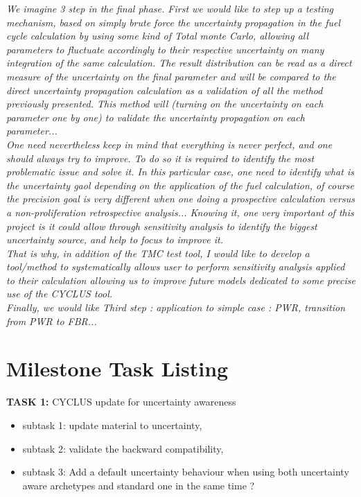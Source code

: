 \documentclass[dvips,12pt]{article}
\begin{document}
\textit{We imagine 3 step in the final phase. First we would like to step up a testing mechanism, based on simply brute force the uncertainty propagation in the fuel cycle calculation by using some kind of Total monte Carlo, allowing all parameters to fluctuate accordingly to their respective uncertainty on many integration of the same calculation. The result distribution can be read as a direct measure of the uncertainty on the final parameter and will be compared to the direct uncertainty propagation calculation as a validation of all the method previously presented. This method will (turning on the uncertainty on each parameter one by one) to validate the uncertainty propagation on each parameter...\\
One need nevertheless keep in mind that everything is never perfect, and one should always try to improve. To do so it is required to identify the most problematic issue and solve it. In this particular case, one need to identify what is the uncertainty gaol depending on the application of the fuel calculation, of course the precision goal is very different when one doing a prospective calculation versus a non-proliferation retrospective analysis... Knowing it, one very important of this project is it could allow through sensitivity analysis to identify the biggest uncertainty source, and help to focus to improve it.\\
That is why, in addition of the TMC test tool, I would like to develop a tool/method to systematically allows user to perform sensitivity analysis applied to their calculation allowing us to improve future models dedicated to some precise use of the CYCLUS tool.\\
Finally, we would like
Third step : application to simple case : PWR, transition from PWR to FBR...}

\pagebreak
\section{Milestone Task Listing}

\noindent\textbf{TASK 1:} CYCLUS update for uncertainty awareness
\begin{itemize}
\item subtask 1: update material to uncertainty,
\item subtask 2: validate the backward compatibility, 
\item subtask 3: Add a default uncertainty behaviour when using both uncertainty aware archetypes and standard one in the same time ?
\end{itemize}
\end{document}

